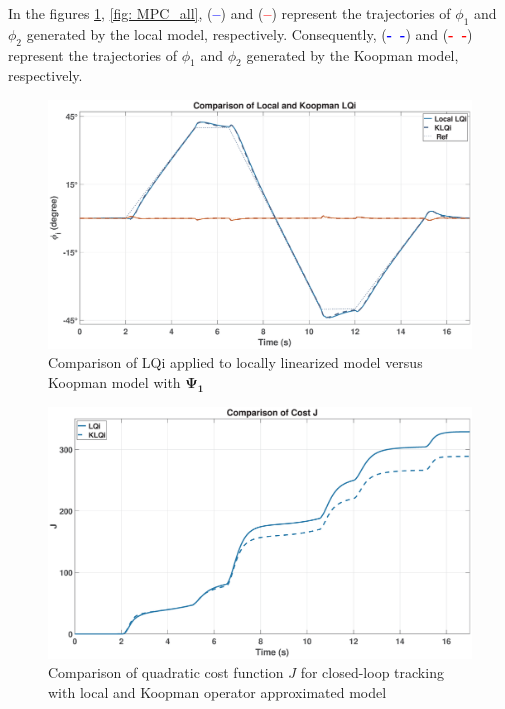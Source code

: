 In the figures \ref{fig: LQi_comp}, \ref{fig: MPC_all}, (\textcolor{blue}{\textbf{--}}) and (\textcolor{red}{\textbf{--}}) represent the trajectories of $\phi_1$ and $\phi_2$ generated by the local model, respectively. Consequently, (\textcolor{blue}{\textbf{-~-}}) and (\textcolor{red}{\textbf{-~-}}) represent the trajectories of $\phi_1$ and $\phi_2$ generated by the Koopman model, respectively.
\begin{figure}[H]
    \centering
    \includegraphics[width=1\linewidth]{figures/LQi_comp_5ms}
    \caption{Comparison of LQi applied to locally linearized model versus Koopman model with $\mathbf{\Psi_1}$}
    \label{fig: LQi_comp}
\end{figure}
% 
\begin{figure}[H]
    \centering
    \includegraphics[width=1\linewidth]{figures/CostsLQi_5ms}
    \caption{Comparison of quadratic cost function $J$ for closed-loop tracking with local and Koopman operator approximated model}
    \label{fig: LQi_cost}
\end{figure}
% 
